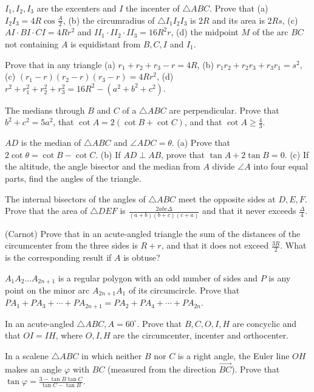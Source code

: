 \item $I_1, I_2, I_3$ are the excenters and $I$ the incenter of $\triangle ABC$. Prove that (a) $I_2I_3 =
  4R\cos\frac{A}{2}$, (b) the circumradius of $\triangle I_1I_2I_3$ is $2R$ and its area is $2Rs$, (c)
  $AI\cdot BI\cdot CI = 4Rr^2$ and $II_1\cdot II_2\cdot II_3 = 16R^2r$, (d) the midpoint $M$ of the arc $BC$
  not containing $A$ is equidistant from $B, C, I$ and $I_1$.
\item Prove that in any triangle (a) $r_1 + r_2 + r_3 - r = 4R$, (b) $r_1r_2 + r_2r_3 + r_3r_1 = s^2$, (c)
  $(r_1 - r)(r_2 - r)(r_3 - r) = 4Rr^2$, (d) $r^2 + r_1^2 + r_2^2 + r_3^2 = 16R^2 - (a^2 + b^2 + c^2)$.
\item The medians through $B$ and $C$ of a $\triangle ABC$ are perpendicular. Prove that $b^2 + c^2 = 5a^2$,
  that $\cot A = 2(\cot B + \cot C)$, and that $\cot A \geq \frac{4}{3}$.
\item $AD$ is the median of $\triangle ABC$ and $\angle ADC = \theta$. (a) Prove that $2\cot\theta = \cot B -
  \cot C$. (b) If $AD\perp AB$, prove that $\tan A + 2\tan B = 0$. (c) If the altitude, the angle bisector
  and the median from $A$ divide $\angle A$ into four equal parts, find the angles of the triangle.
\item The internal bisectors of the angles of $\triangle ABC$ meet the opposite sides at $D, E, F$. Prove
  that the area of $\triangle DEF$ is $\frac{2abc\Delta}{(a + b)(b + c)(c + a)}$ and that it never exceeds
  $\frac{\Delta}{4}$.
\item (Carnot) Prove that in an acute-angled triangle the sum of the distances of the circumcenter from the
  three sides is $R + r$, and that it does not exceed $\frac{3R}{2}$. What is the corresponding result if $A$
  is obtuse?
\item $A_1A_2\ldots A_{2n + 1}$ is a regular polygon with an odd number of sides and $P$ is any point on the
  minor arc $A_{2n + 1}A_1$ of its circumcircle. Prove that $PA_1 + PA_3 + \cdots + PA_{2n + 1} = PA_2 + PA_4 +
  \cdots + PA_{2n}$.
\item In an acute-angled $\triangle ABC, A = 60^\circ$. Prove that $B, C, O, I, H$ are concyclic and that $OI
  = IH$, where $O, I, H$ are the circumcenter, incenter and orthocenter.
\item In a scalene $\triangle ABC$ in which neither $B$ nor $C$ is a right angle, the Euler line $OH$ makes an angle $\varphi$ with $BC$ (measured from the
  direction $\overrightarrow{BC}$). Prove that $\tan\varphi = \frac{3 - \tan B\tan C}{\tan C - \tan B}$.
